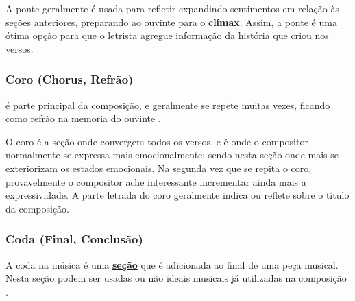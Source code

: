 A ponte geralmente é usada para refletir expandindo sentimentos em relação às seções anteriores,
preparando ao ouvinte para o \hyperref[ref:climax]{\textbf{clímax}}.
Assim, a ponte é uma ótima opção para que o letrista agregue informação da história que criou nos versos.

\subsubsection{Coro (Chorus, Refrão)}
\label{ref:Coro}

é parte principal da composição, 
e geralmente  se repete muitas vezes, 
ficando como refrão na memoria do ouvinte
\cite[pp. 18]{adolfo1997composicao}.

O coro é a seção onde convergem todos os versos, 
e é onde o compositor normalmente se expressa mais emocionalmente;
sendo nesta seção onde mais se exteriorizam os estados emocionais. 
Na segunda vez que se repita o coro, 
provavelmente o compositor ache interessante incrementar ainda mais a expressividade.
A parte letrada do coro geralmente indica ou reflete sobre o título da composição.

\subsubsection{Coda (Final, Conclusão)}
\label{ref:Coda}
A coda na música é uma \hyperref[ref:Secao]{\textbf{seção}}  que é adicionada ao final de uma peça musical. 
Nesta seção podem ser usadas ou não ideais musicais já utilizadas na composição
\cite[pp. 17]{adolfo1997composicao}.





